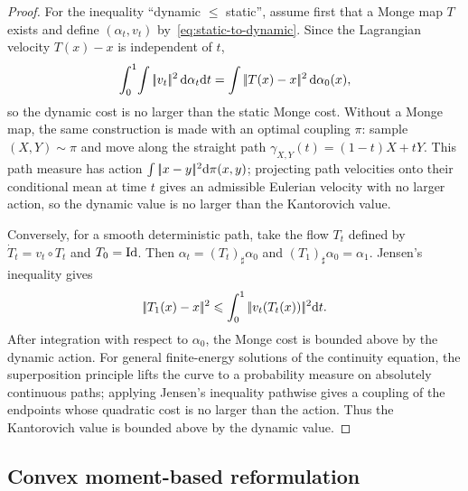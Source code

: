 \begin{proof}
	For the inequality ``dynamic $\leq$ static'', assume first that a Monge map $T$ exists and define $(\alpha_t,v_t)$ by~\eqref{eq:static-to-dynamic}. Since the Lagrangian velocity $T(x)-x$ is independent of $t$,
	\[
		\int_0^1\!\int|\!| v_t |\!|^2\,\mathrm{d}\alpha_t\mathrm{d} t
		=
		\int|\!| T(x)-x |\!|^2\,\mathrm{d}\alpha_0(x),
	\]
	so the dynamic cost is no larger than the static Monge cost. Without a Monge map, the same construction is made with an optimal coupling $\pi$: sample $(X,Y)\sim\pi$ and move along the straight path $\gamma_{X,Y}(t)=(1-t)X+tY$. This path measure has action $\int|\!| x-y |\!|^2\mathrm{d}\pi(x,y)$; projecting path velocities onto their conditional mean at time $t$ gives an admissible Eulerian velocity with no larger action, so the dynamic value is no larger than the Kantorovich value.

	Conversely, for a smooth deterministic path, take the flow $T_t$ defined by $\dot T_t=v_t\circ T_t$ and $T_0=\mathrm{Id}$. Then $\alpha_t=(T_t)_\sharp\alpha_0$ and $(T_1)_\sharp\alpha_0=\alpha_1$. Jensen's inequality gives
	\[
		|\!| T_1(x)-x |\!|^2
		\leqslant
		\int_0^1|\!| v_t(T_t(x)) |\!|^2\mathrm{d} t.
	\]
	After integration with respect to $\alpha_0$, the Monge cost is bounded above by the dynamic action. For general finite-energy solutions of the continuity equation, the superposition principle lifts the curve to a probability measure on absolutely continuous paths; applying Jensen's inequality pathwise gives a coupling of the endpoints whose quadratic cost is no larger than the action. Thus the Kantorovich value is bounded above by the dynamic value.
\end{proof}

\subsection{Convex moment-based reformulation}

